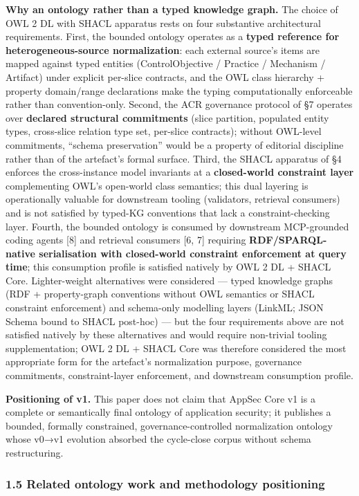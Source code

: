 \documentclass[
]{article}
\begin{document}
\textbf{Why an ontology rather than a typed knowledge graph.} The choice
of OWL 2 DL with SHACL apparatus rests on four substantive architectural
requirements. First, the bounded ontology operates as a \textbf{typed
reference for heterogeneous-source normalization}: each external
source's items are mapped against typed entities (ControlObjective /
Practice / Mechanism / Artifact) under explicit per-slice contracts, and
the OWL class hierarchy + property domain/range declarations make the
typing computationally enforceable rather than convention-only. Second,
the ACR governance protocol of §7 operates over \textbf{declared
structural commitments} (slice partition, populated entity types,
cross-slice relation type set, per-slice contracts); without OWL-level
commitments, ``schema preservation'' would be a property of editorial
discipline rather than of the artefact's formal surface. Third, the
SHACL apparatus of §4 enforces the cross-instance model invariants at a
\textbf{closed-world constraint layer} complementing OWL's open-world
class semantics; this dual layering is operationally valuable for
downstream tooling (validators, retrieval consumers) and is not
satisfied by typed-KG conventions that lack a constraint-checking layer.
Fourth, the bounded ontology is consumed by downstream MCP-grounded
coding agents {[}8{]} and retrieval consumers {[}6, 7{]} requiring
\textbf{RDF/SPARQL-native serialisation with closed-world constraint
enforcement at query time}; this consumption profile is satisfied
natively by OWL 2 DL + SHACL Core. Lighter-weight alternatives were
considered --- typed knowledge graphs (RDF + property-graph conventions
without OWL semantics or SHACL constraint enforcement) and schema-only
modelling layers (LinkML; JSON Schema bound to SHACL post-hoc) --- but
the four requirements above are not satisfied natively by these
alternatives and would require non-trivial tooling supplementation; OWL
2 DL + SHACL Core was therefore considered the most appropriate form for
the artefact's normalization purpose, governance commitments,
constraint-layer enforcement, and downstream consumption profile.

\textbf{Positioning of v1.} This paper does not claim that AppSec Core
v1 is a complete or semantically final ontology of application security;
it publishes a bounded, formally constrained, governance-controlled
normalization ontology whose v0→v1 evolution absorbed the cycle-close
corpus without schema restructuring.

\subsubsection{1.5 Related ontology work and methodology
positioning}\label{related-ontology-work-and-methodology-positioning}
\end{document}
